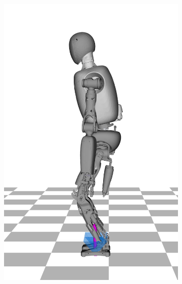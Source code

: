 \begin{figure}
\begin{subfigure}{.16\textwidth}
	\includegraphics[width=1\linewidth]{fig/jumpVertical/snaps/1x}
	\caption{}
	\end{subfigure}%
\begin{subfigure}{.16\textwidth}

\end{subfigure}
\end{figure}
